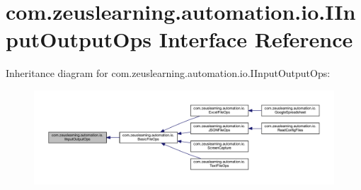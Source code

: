 \hypertarget{interfacecom_1_1zeuslearning_1_1automation_1_1io_1_1IInputOutputOps}{}\section{com.\+zeuslearning.\+automation.\+io.\+I\+Input\+Output\+Ops Interface Reference}
\label{interfacecom_1_1zeuslearning_1_1automation_1_1io_1_1IInputOutputOps}


Inheritance diagram for com.\+zeuslearning.\+automation.\+io.\+I\+Input\+Output\+Ops\+:\nopagebreak
\begin{figure}[H]
\begin{center}
\leavevmode
\includegraphics[width=350pt]{dc/d8a/interfacecom_1_1zeuslearning_1_1automation_1_1io_1_1IInputOutputOps__inherit__graph}
\end{center}
\end{figure}
